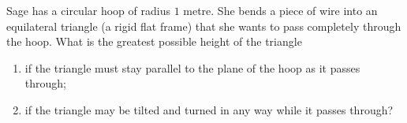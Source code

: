 Sage has a circular hoop of radius $1$ metre. She bends a piece of wire into an equilateral triangle (a rigid flat frame) that she wants to pass completely through the hoop. What is the greatest possible height of the triangle
\begin{enumerate}
\item[(a)] if the triangle must stay parallel to the plane of the hoop as it passes through;
\item[(b)] if the triangle may be tilted and turned in any way while it passes through?
\end{enumerate}
